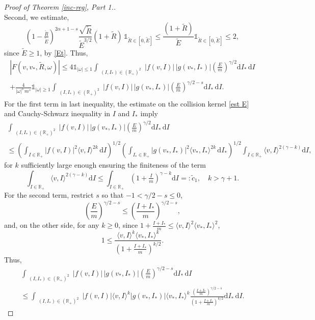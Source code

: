 \documentclass[11pt,a4paper]{amsart}
\newcommand{\bRp}{\mathbb{R}_+}
\newcommand{\md}{\mathrm{d}}
\newcommand{\g}{\gamma}
\newcommand{\la}{\langle}
\newcommand{\ra}{\rangle}
\newcommand{\E}{\left(\frac{E}{m}\right)}
\newcommand{\ien}{\int_{\substack{(I,I_*)\in (\bRp)^2 }}}
\newcommand{\Et}{\tilde{E}}
\newcommand{\cI}{\tilde{c}_1}
\begin{document}
\begin{proof}[Proof of Theorem \ref{inc-reg}, Part 1.]
\begin{equation*}
\end{equation*}
Second, we estimate,
\begin{equation*}
	\left(1-\tfrac{\tilde{R}}{\Et}\right)^{2\alpha+1 - s } \frac{\sqrt{\tilde{R}}}{\Et^{3/2}}  (1+\tilde{R}) \, \mathds{1}_{\tilde{R}\in[0,\Et]}    \leq \frac{ (1+\tilde{R})}{\Et} \mathds{1}_{\tilde{R}\in[0,\Et]}  \leq 2,
\end{equation*}
since $\Et \geq 1$, by \eqref{Et}. Thus,
\begin{multline}\label{est F}
\left| 	F(v,v_*,\tilde{R},\omega)  \right| \leq 4  \mathds{1}_{|\omega| \leq 1} \ien  |f(v,I)| \, |g(v_*,I_*)|  \E^{\g/2} \md I_* \, \md I
\\  + \frac{4 }{|\omega|^s  \, m^s} \mathds{1}_{|\omega| \geq 1} \ien  |f(v,I)| \, |g(v_*,I_*)|  \E^{\g/2-s} \md I_* \, \md I.
\end{multline}
For the first term in last inequality, the estimate on the collision kernel \eqref{est E} and Cauchy-Schwarz inequality in $I$ and $I_*$ imply
\begin{multline*}
\ien  |f(v,I)| \, |g(v_*,I_*)|  \E^{\g/2} \md I_* \, \md I 
\\
 \leq \left( \int_{I\in \bRp} |f(v,I)|^2   \la v, I \ra^{2k} \, \md I \right)^{1/2} \left( \int_{I_*\in \bRp} |g(v_*,I_*)|^2   \la v_*, I_* \ra^{2k} \,  \md I_*  \right)^{1/2} \int_{I\in \bRp} \la v, I \ra^{2(\gamma - k)} \md I,
\end{multline*}
for $k$ sufficiently large enough ensuring the finiteness of the term
\begin{equation}\label{c1 tilde}
\int_{I\in \bRp} \la v, I \ra^{2(\gamma - k)} \md I \leq \int_{I\in \bRp} \left(1+\tfrac{I}{m}  \right)^{\gamma - k} \md I   =: \cI, \quad k > \gamma+1.
\end{equation}
For the second term, restrict $s$ so that $-1 < \gamma/2-s \leq 0$, 
\begin{equation*}
\E^{\g/2 - s } \leq \left(\frac{ I +I_*}{m}\right)^{\g/2-s},
\end{equation*}
and, on the other side, for any $k\geq 0$, since $1+\tfrac{I+I_*}{m}\leq \la v, I\ra^{2}\la v_*, I_*\ra^{2}$,
\begin{equation*}
	1 \leq \frac{\la v, I\ra^{k}\la v_*, I_*\ra^{k}}{\left(1+\tfrac{I+I_*}{m}\right)^{k/2}}.
\end{equation*}
Thus,
\begin{multline*}
 \ien  |f(v,I)| \, |g(v_*,I_*)|  \E^{\g/2-s} \md I_* \, \md I    
 \\
 \leq  \ien  |f(v,I)|   \la v, I \ra^{k}  |g(v_*,I_*)|  \la v_*, I_* \ra^{k}  \frac{\left(\frac{ I +I_*}{m}\right)^{\g/2-s}}{\left(1+\tfrac{I+I_*}{m}\right)^{k/2}} \md I_* \, \md I.

\end{multline*}
\end{proof}
\end{document}
